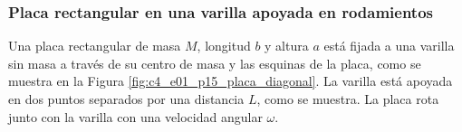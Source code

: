 \subsubsection{Placa rectangular en una varilla apoyada en rodamientos}

Una placa rectangular de masa $M$, longitud $b$ y altura $a$ está fijada a una varilla sin masa
a través de su centro de masa y las esquinas de la placa, como se muestra en la Figura
\ref{fig:c4_e01_p15_placa_diagonal}. La varilla está apoyada en dos puntos separados por una
distancia $L$, como se muestra. La placa rota junto con la varilla con una velocidad angular
$\omega$.

